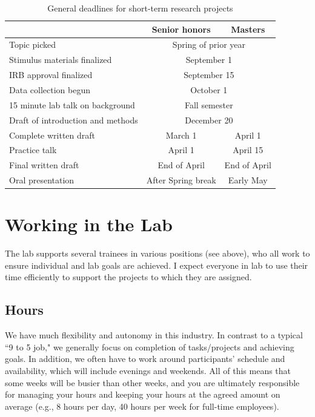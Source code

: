 \documentclass[letterpaper,11pt,oneside]{memoir}
\begin{document}
\begin{table}
\centering
\caption{General deadlines for short-term research projects}
\begin{tabular}{lcc}
\toprule
& Senior honors & Masters\\
\midrule
Topic picked& \multicolumn{2}{c}{Spring of prior year}\\
Stimulus materials finalized& \multicolumn{2}{c}{September 1}\\
IRB approval finalized& \multicolumn{2}{c}{September 15}\\
Data collection begun& \multicolumn{2}{c}{October 1}\\
15 minute lab talk on background& \multicolumn{2}{c}{Fall semester}\\
Draft of introduction and methods& \multicolumn{2}{c}{December 20}\\
Complete written draft& March 1& April 1\\
Practice talk& April 1 & April 15\\
Final written draft& End of April & End of April\\
Oral presentation& After Spring break & Early May\\
\bottomrule
\end{tabular}
\label{table:deadlines}
\end{table}


\section{Working in the Lab}

The lab supports several trainees in various positions (see above), who all work to ensure individual and lab goals are achieved. I expect everyone in lab to use their time efficiently to support the projects to which they are assigned. 

\subsection{Hours}
We have much flexibility and autonomy in this industry. In contrast to a typical ``9 to 5 job," we generally focus on completion of tasks/projects and achieving goals. In addition, we often have to work around participants' schedule and availability, which will include evenings and weekends. All of this means that some weeks will be busier than other weeks, and you are ultimately responsible for managing your hours and keeping your hours at the agreed amount on average (e.g., 8 hours per day, 40 hours per week for full-time employees). 
\end{document}
